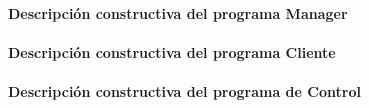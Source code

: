 \paragraph{Descripción constructiva del programa Manager}


\paragraph{Descripción constructiva del programa Cliente}


\paragraph{Descripción constructiva del programa de Control}

